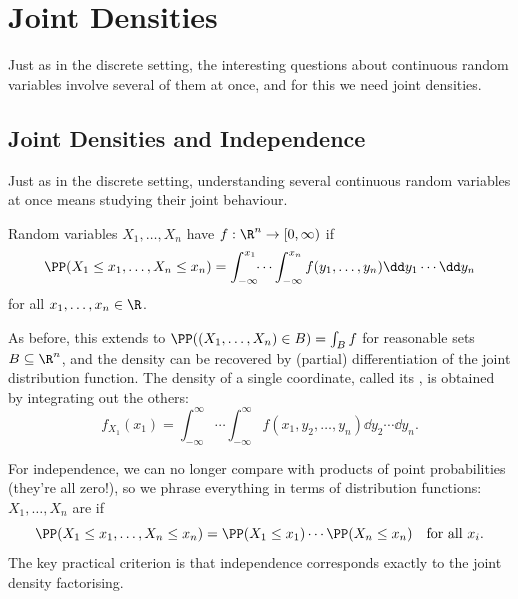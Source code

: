 \section{Joint Densities}

Just as in the discrete setting, the interesting questions about continuous random variables involve several of them at once, and for this we need joint densities.

\subsection{Joint Densities and Independence}

Just as in the discrete setting, understanding several continuous random variables at once means studying their joint behaviour.

\begin{definition}
	Random variables $X_1, \dots, X_n$ have  $f: \R^n \rightarrow [0, \infty)$ if
	$$
	\PP(X_1 \leq x_1, \dots, X_n \leq x_n) = \int_{-\infty}^{x_1} \!\!\cdots \int_{-\infty}^{x_n} f(y_1, \dots, y_n) \dd y_1 \cdots \dd y_n
	$$
	for all $x_1, \dots, x_n \in \R$.
\end{definition}

As before, this extends to $\PP((X_1, \dots, X_n) \in B) = \int_B f$ for reasonable sets $B \subseteq \R^n$, and the density can be recovered by (partial) differentiation of the joint distribution function. The density of a single coordinate, called its , is obtained by integrating out the others:
$$
f_{X_1}(x_1) = \int_{-\infty}^{\infty}\!\!\cdots\int_{-\infty}^{\infty} f(x_1, y_2, \dots, y_n) \dd y_2 \cdots \dd y_n.
$$

For independence, we can no longer compare with products of point probabilities (they're all zero!), so we phrase everything in terms of distribution functions: $X_1, \dots, X_n$ are  if
$$
\PP(X_1 \leq x_1, \dots, X_n \leq x_n) = \PP(X_1 \leq x_1) \cdots \PP(X_n \leq x_n) \quad \text{for all } x_i.
$$
The key practical criterion is that independence corresponds exactly to the joint density factorising.

